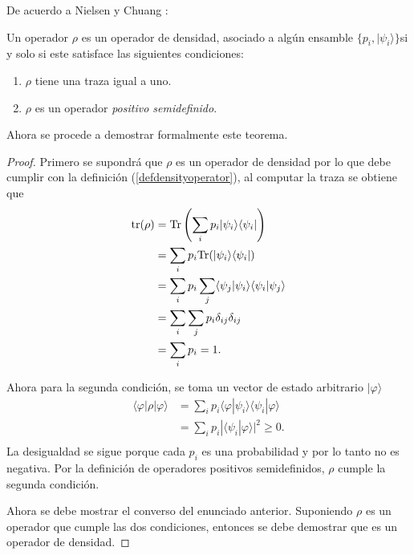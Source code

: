 De acuerdo a Nielsen y Chuang {\cite{nielsen_chuang_2010}}:
\begin{theorem} Un operador
$\rho$ es un operador de densidad, asociado a algún ensamble $\{p_i,
|\psi_i\rangle\}$si y solo si este satisface las siguientes condiciones:
\begin{enumerate}
	\item $\rho$ tiene una traza igual a uno.
	\item $\rho $ es un operador \textit{positivo semidefinido}.
\end{enumerate}	
\end{theorem}

Ahora se procede a demostrar formalmente este teorema.
\begin{proof}
	Primero se supondrá que $\rho $ es un operador de densidad por lo que debe cumplir con la definición ({\ref{defdensityoperator}}), al computar la traza se obtiene que \begin{equation*}
		\begin{split}
			{\rm tr(\rho)}&={\rm Tr}\left(\sum_{i} p_i|\psi_i\rangle \langle \psi_i|\right) \\
			&=	\sum_{i}p_i {\rm Tr}(|\psi_i\rangle \langle \psi_i|)\\
			&=\sum_{i}p_i \sum_j\langle \psi_j|\psi_i\rangle \langle \psi_i|\psi_j\rangle\\
			&=\sum_{i}\sum_j p_i \delta_{ij} \delta_{ij}\\
			&=\sum_i p_i=1.\\
		\end{split}
	\end{equation*}

Ahora para la segunda condición, se toma un vector de estado arbitrario $|\varphi \rangle$ \begin{equation*}
	\begin{split}
	\langle \varphi |	\rho|\varphi \rangle&=\sum_{i}p_i\langle \varphi |\psi_i\rangle \langle \psi_i|\varphi \rangle \\
	&=\sum_{i}p_i| \langle \psi_i|\varphi \rangle|^2 \ge 0.\\
	\end{split}
\end{equation*}
La desigualdad se sigue porque cada $p_i$ es una probabilidad y por lo tanto no es negativa. Por la definición de operadores positivos semidefinidos, $\rho$ cumple la segunda condición.


Ahora se debe mostrar el converso del enunciado anterior. Suponiendo $\rho$ es un operador que cumple las dos condiciones, entonces se debe demostrar que es un operador de densidad.


\end{proof}
